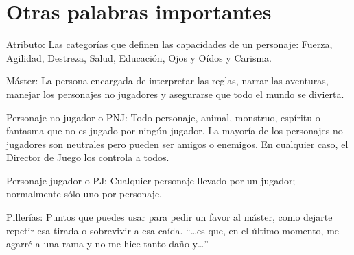 \section{Otras palabras importantes}

\begin{description}

\item{Atributo:} 
Las categorías que definen las capacidades de un personaje: Fuerza, Agilidad, Destreza, Salud, Educación, Ojos y Oídos y Carisma.

\item{Máster:} 
La persona encargada de interpretar las reglas, narrar las aventuras, manejar los personajes no jugadores y asegurarse que todo el mundo se divierta.

\item{Personaje no jugador o PNJ:} 
Todo personaje, animal, monstruo, espíritu o fantasma que no es jugado por ningún jugador. La mayoría de los personajes no jugadores son neutrales pero pueden ser amigos o enemigos. En cualquier caso, el Director de Juego los controla a todos.

\item{Personaje jugador o PJ:} 
Cualquier personaje llevado por un jugador; normalmente sólo uno por personaje.

\item{Pillerías:}
Puntos que puedes usar para pedir un favor al máster, como dejarte repetir esa tirada o sobrevivir a esa caída. \enquote{\dots es que, en el último momento, me agarré a una rama y no me hice tanto daño y\dots}

\end{description}